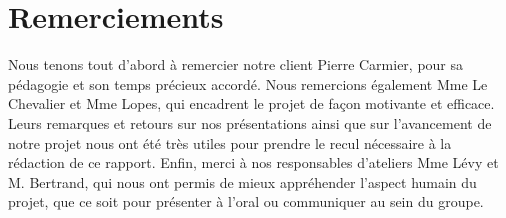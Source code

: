 \section*{Remerciements}

Nous tenons tout d'abord à remercier notre client Pierre Carmier,
pour sa pédagogie et son temps précieux accordé. 
Nous remercions également Mme Le Chevalier et Mme Lopes, qui encadrent
le projet de façon motivante et efficace.
Leurs remarques et retours sur nos présentations 
ainsi que sur l'avancement de notre projet
nous ont été très utiles pour prendre le recul
nécessaire à la rédaction de ce rapport.
Enfin, merci à nos responsables d'ateliers Mme Lévy et M. Bertrand, qui nous ont permis de mieux appréhender l'aspect humain du projet, que ce soit pour présenter à l'oral ou communiquer au sein du groupe.